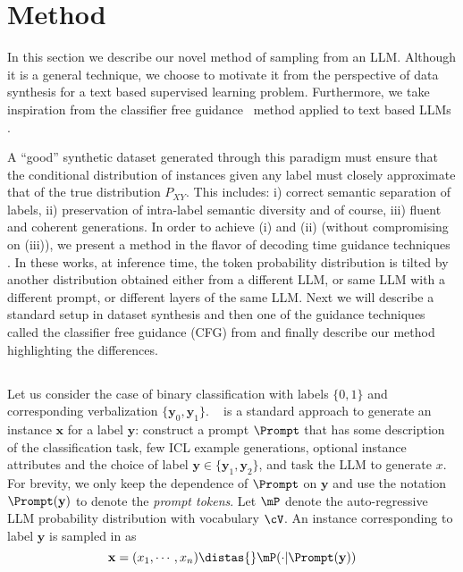 \section{Method}
\label{sec:method}
In this section we describe our novel \corrsyn{} method of sampling from an LLM. Although it is a general technique, we choose to motivate it from the perspective of data synthesis for a text based supervised learning problem. Furthermore, we take inspiration from the classifier free guidance~\cite{ho2021classifierfree} method applied to text based LLMs \cite{sanchez2023stay}.



A ``good'' synthetic dataset generated through this paradigm must ensure that the conditional distribution of instances given any label must closely approximate that of the true distribution $P_{XY}$. This includes: i) correct semantic separation of labels, ii) preservation of intra-label semantic diversity and of course, iii) fluent and coherent generations. In order to achieve (i) and (ii) (without compromising on (iii)), we present a method in the flavor of decoding time guidance techniques \cite{li2023contrastive,o2023contrastive,sanchez2023stay,chuang2023dola}. In these works, at inference time, the token probability distribution is tilted by another distribution obtained either from a different LLM, or same LLM with a different prompt, or different layers of the same LLM. Next we will describe a standard setup in dataset synthesis \fewgen{} and then one of the guidance techniques called the classifier free guidance (CFG) from \cite{sanchez2023stay} and finally describe our method highlighting the differences.

\subsection{\fewgen{}}
Let us consider the case of binary classification with labels $\{0,1\}$ and corresponding verbalization $\{\mathbf{y}_0,\mathbf{y}_1\}$. \fewgen{}~\cite{ye2022zerogen} is a standard approach to generate an instance $\mathbf{x}$ for a label $\mathbf{y}$: construct a prompt $\Prompt$ that has some description of the classification task, few ICL example generations, optional instance attributes and the choice of label $\mathbf{y}\in\{\mathbf{y}_1,\mathbf{y}_2\}$, and task the LLM to generate $x$. For brevity, we only keep the dependence of $\Prompt$ on $\mathbf{y}$ and use the notation $\Prompt(\mathbf{y})$ to denote the \textit{prompt tokens}. Let $\mP$ denote the auto-regressive LLM probability distribution with vocabulary $\cV$. An instance corresponding to label $\mathbf{y}$ is sampled in \fewgen{} as 
\begin{equation}
\label{eq:std_sample}
    \mathbf{x}=(x_1,\cdots,x_n)\distas{}\mP(\cdot|\Prompt(\mathbf{y}))
\end{equation}



